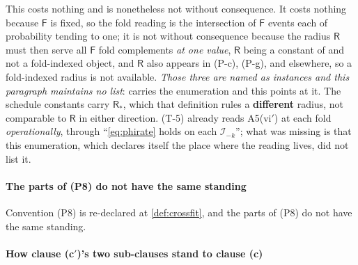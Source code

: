 This costs nothing and is nonetheless not without consequence. It costs nothing because $\mathsf F$
is fixed, so the fold reading is the intersection of $\mathsf F$ events each of probability tending to one;
it is not without consequence because the radius $\mathsf R$ must then serve all $\mathsf F$ fold
complements \emph{at one value}, $\mathsf R$ being a constant of  and not a fold-indexed
object, and $\mathsf R$ also appears in (P-c), (P-g),  and elsewhere, so a
fold-indexed radius is not available. \emph{Those three are named as instances and this paragraph
maintains no list}:  carries the enumeration and this points at it. The
schedule constants carry $\mathsf R_\ast$, which that definition rules a \textbf{different} radius,
not comparable to $\mathsf R$ in either direction. (T-5) already reads
A5(vi$'$) at each fold \emph{operationally}, through ``\eqref{eq:phirate} holds on each
$\mathcal I_{-k}$''; what was missing is that this enumeration, which declares itself the place where
the reading lives, did not list it.


\paragraph{The parts of \textup{(P8)} do not have the same standing}

Convention \textup{(P8)} is re-declared at \cref{def:crossfit}, and the parts of
\textup{(P8)} do not have the same standing.

\paragraph{How clause \textup{(c$'$)}'s two sub-clauses stand to clause \textup{(c)}}

